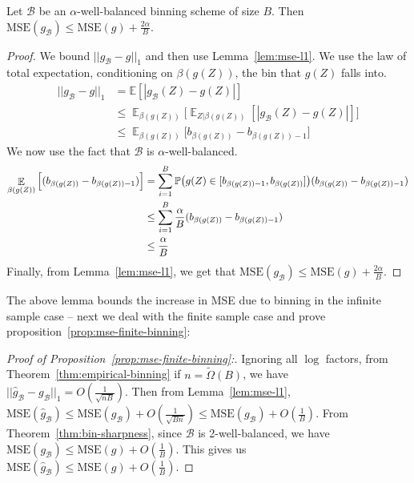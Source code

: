\begin{lemma}
\label{thm:bin-sharpness}
Let $\mathcal{B}$ be an $\alpha$-well-balanced binning scheme of size $B$. Then $\mbox{MSE}(g_{\mathcal{B}}) \leq \mbox{MSE}(g) + \frac{2\alpha}{B}$.
\end{lemma}

\begin{proof}
We bound $||g_{\mathcal{B}} - g||_1$ and then use Lemma~\ref{lem:mse-l1}. We use the law of total expectation, conditioning on $\beta(g(Z))$, the bin that $g(Z)$ falls into.
\begin{align*}
||g_{\mathcal{B}} - g||_1 &= \mathbb{E}[|g_{\mathcal{B}}(Z) - g(Z)|] \\
&\leq \mathop{\mathbb{E}}_{\beta(g(Z))} \Big[ \mathop{\mathbb{E}}_{Z | \beta(g(Z))} [ |g_{\mathcal{B}}(Z) - g(Z)| ]\Big]\\
&\leq \mathop{\mathbb{E}}_{\beta(g(Z))} \Big[ b_{\beta(g(Z))} - b_{\beta(g(Z))-1}\Big]
\end{align*}
We now use the fact that $\mathcal{B}$ is $\alpha$-well-balanced.
\begin{align*}
\mathop{\mathbb{E}}_{\beta(g(Z))} \Big[ (b_{\beta(g(Z))} - b_{\beta(g(Z))-1})\Big] &= \sum_{i=1}^B \mathbb{P}\big(g(Z) \in [b_{\beta(g(Z))-1}, b_{\beta(g(Z))}]\big) (b_{\beta(g(Z))} - b_{\beta(g(Z))-1}) \\
&\leq \sum_{i=1}^B \frac{\alpha}{B} (b_{\beta(g(Z))} - b_{\beta(g(Z))-1}) \\
&\leq \frac{\alpha}{B}
\end{align*}
Finally, from Lemma~\ref{lem:mse-l1}, we get that $\mbox{MSE}(g_{\mathcal{B}}) \leq \mbox{MSE}(g) + \frac{2\alpha}{B}$.
\end{proof}

The above lemma bounds the increase in MSE due to binning in the infinite sample case -- next we deal with the finite sample case and prove proposition~\ref{prop:mse-finite-binning}:

\begin{proof}[Proof of Proposition~\ref{prop:mse-finite-binning}:]
Ignoring all $\log$ factors, from Theorem~\ref{thm:empirical-binning} if $n = \widetilde{\Omega}(B)$, we have $||\hat{g}_{\mathcal{B}} - g_{\mathcal{B}}||_1 = O(\frac{1}{\sqrt{nB}})$. Then from  Lemma~\ref{lem:mse-l1}, $\mbox{MSE}(\hat{g}_{\mathcal{B}}) \leq \mbox{MSE}(g_{\mathcal{B}}) + O(\frac{1}{\sqrt{Bn}}) \leq \mbox{MSE}(g_{\mathcal{B}}) + O(\frac{1}{B})$. From Theorem~\ref{thm:bin-sharpness}, since $\mathcal{B}$ is 2-well-balanced, we have  $\mbox{MSE}(g_{\mathcal{B}}) \leq \mbox{MSE}(g) + O(\frac{1}{B})$. This gives us $\mbox{MSE}(\hat{g}_{\mathcal{B}}) \leq \mbox{MSE}(g) + O(\frac{1}{B})$.
\end{proof}

